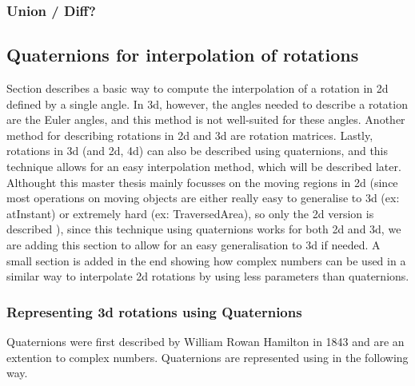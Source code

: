 		
		\subsubsection{Union / Diff?}
		
			
	\subsection{Quaternions for interpolation of rotations}
	
	
	Section  describes a basic way to compute the interpolation of a rotation in 2d defined by a single angle. In 3d, however, the angles needed to describe a rotation are the Euler angles, and this method is not well-suited for these angles.  Another method for describing rotations in 2d and 3d are rotation matrices.  Lastly, rotations in 3d (and 2d, 4d) can also be described using quaternions, and this technique allows for an easy interpolation method, which will be described later. Althought this master thesis mainly focusses on the moving regions in 2d (since most operations on moving objects are either really easy to generalise to 3d (ex: atInstant) or extremely hard (ex: TraversedArea), so only the 2d version is described ), since this technique using quaternions works for both 2d and 3d, we are adding this section to allow for an easy generalisation to 3d if needed. A small section is added in the end showing how complex numbers can be used in a similar way to interpolate 2d rotations by using less parameters than quaternions.
	
		\subsubsection{Representing 3d rotations using Quaternions}
		
		Quaternions were first described by William Rowan Hamilton in 1843  and are an extention to complex numbers. Quaternions are represented using in the following way.
		
